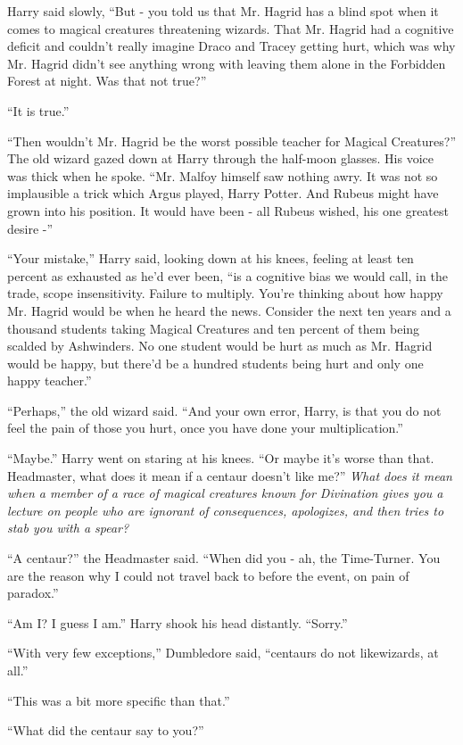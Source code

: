 Harry said slowly, “But - you told us that Mr. Hagrid has a blind spot when it comes to magical creatures threatening wizards. That Mr. Hagrid had a cognitive deficit and couldn't really imagine Draco and Tracey getting hurt, which was why Mr. Hagrid didn't see anything wrong with leaving them alone in the Forbidden Forest at night. Was that not true?”

“It is true.”

“Then wouldn't Mr. Hagrid be the worst possible teacher for Magical Creatures?”
The old wizard gazed down at Harry through the half-moon glasses. His voice was thick when he spoke. “Mr. Malfoy himself saw nothing awry. It was not so implausible a trick which Argus played, Harry Potter. And Rubeus might have grown into his position. It would have been - all Rubeus wished, his one greatest desire -”

“Your mistake,” Harry said, looking down at his knees, feeling at least ten percent as exhausted as he'd ever been, “is a cognitive bias we would call, in the trade, scope insensitivity. Failure to multiply. You're thinking about how happy Mr. Hagrid would be when he heard the news. Consider the next ten years and a thousand students taking Magical Creatures and ten percent of them being scalded by Ashwinders. No one student would be hurt as much as Mr. Hagrid would be happy, but there'd be a hundred students being hurt and only one happy teacher.”

“Perhaps,” the old wizard said. “And your own error, Harry, is that you do not feel the pain of those you hurt, once you have done your multiplication.”

“Maybe.” Harry went on staring at his knees. “Or maybe it's worse than that. Headmaster, what does it mean if a centaur doesn't like me?” \emph{What does it mean when a member of a race of magical creatures known for Divination gives you a lecture on people who are ignorant of consequences, apologizes, and then tries to stab you with a spear?}

“A centaur?” the Headmaster said. “When did you - ah, the Time-Turner. You are the reason why I could not travel back to before the event, on pain of paradox.”

“Am I? I guess I am.” Harry shook his head distantly. “Sorry.”

“With very few exceptions,” Dumbledore said, “centaurs do not likewizards, at all.”

“This was a bit more specific than that.”

“What did the centaur say to you?”

